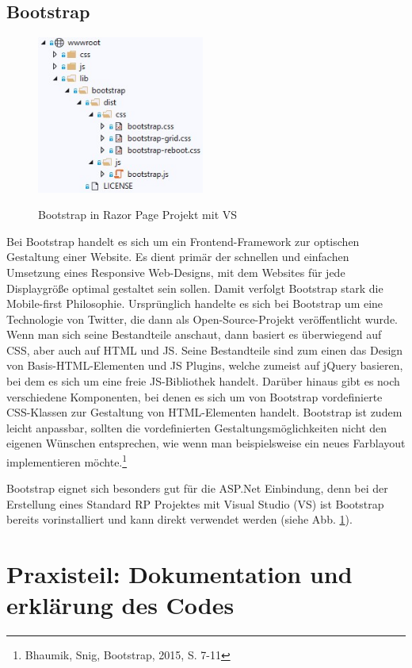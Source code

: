 \documentclass[a4paper,
12pt,
oneside]
{article}
\newcommand{\sPar}{\par\vspace*{6pt}}
\begin{document}
	\subsection{Bootstrap}
	 \begin{figure}
	 	\centering
	 	\caption{Bootstrap in Razor Page Projekt mit VS} 
	 	\includegraphics[width=5.5cm]{img/bootstrap_asp.jpg} \\
	 	\label{fig:bootstrap_asp}
	 \end{figure}
	Bei Bootstrap handelt es sich um ein Frontend-Framework zur optischen Gestaltung einer Website. Es dient primär der schnellen und einfachen Umsetzung eines Responsive Web-Designs, mit dem Websites für jede Displaygröße optimal gestaltet sein sollen. Damit verfolgt Bootstrap stark die Mobile-first Philosophie. Ursprünglich handelte es sich bei Bootstrap um eine Technologie von Twitter, die dann als Open-Source-Projekt veröffentlicht wurde. Wenn man sich seine Bestandteile anschaut, dann basiert es überwiegend auf CSS, aber auch auf HTML und JS. Seine Bestandteile sind zum einen das Design von Basis-HTML-Elementen und JS Plugins, welche zumeist auf jQuery basieren, bei dem es sich um eine freie JS-Bibliothek handelt. 
	Darüber hinaus gibt es noch verschiedene Komponenten, bei denen es sich um von Bootstrap vordefinierte CSS-Klassen zur Gestaltung von HTML-Elementen handelt. Bootstrap ist zudem leicht anpassbar, sollten die vordefinierten Gestaltungsmöglichkeiten nicht den eigenen Wünschen entsprechen, wie wenn man beispielsweise ein neues Farblayout implementieren möchte.\footnote{Bhaumik, Snig, Bootstrap, 2015, S. 7-11} \sPar
	Bootstrap eignet sich besonders gut für die ASP.Net Einbindung, denn bei der Erstellung eines Standard RP Projektes mit Visual Studio (VS) ist Bootstrap bereits vorinstalliert und kann direkt verwendet werden (siehe Abb. \ref{fig:bootstrap_asp}).
	\clearpage
	
	
	
	
	
	\section{Praxisteil: Dokumentation und erklärung des Codes}
	
\end{document}

